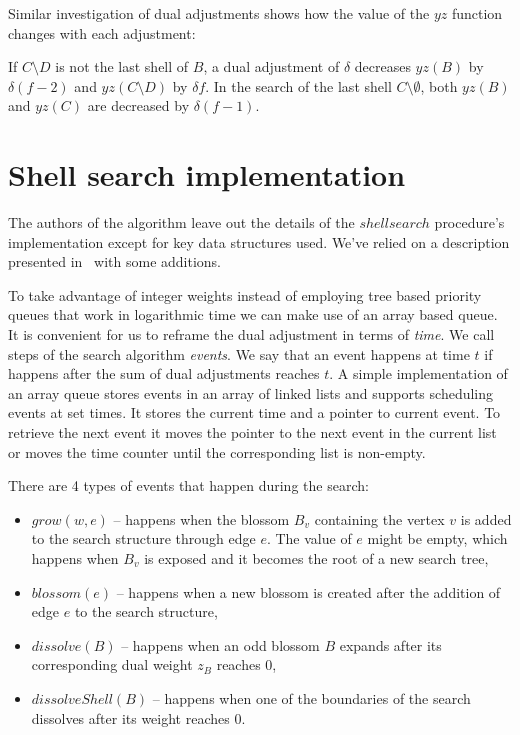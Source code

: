 Similar investigation of dual adjustments shows how the value of the $yz$ function changes with each adjustment:

\begin{lemma}\label{lem:search_duals}
    If $C \setminus D$ is not the last shell of $B$, a dual adjustment of $\delta$ decreases $yz(B)$ by $\delta(f-2)$ and $yz(C \setminus D)$ by $\delta f$. In the search of the last shell $C \setminus \emptyset$, both $yz(B)$ and $yz(C)$ are decreased by $\delta(f-1)$.
\end{lemma}

\section{Shell search implementation}

The authors of the algorithm leave out the details of the $shellsearch$ procedure's implementation except for key data structures used. We've relied on a description presented in~\cite{duan2018scaling} with some additions.

To take advantage of integer weights instead of employing tree based priority queues that work in logarithmic time we can make use of an array based queue. It is convenient for us to reframe the dual adjustment in terms of \textit{time}. We call steps of the search algorithm \textit{events}. We say that an event happens at time $t$ if happens after the sum of dual adjustments reaches $t$. A simple implementation of an array queue stores events in an array of linked lists and supports scheduling events at set times. It stores the current time and a pointer to current event. To retrieve the next event it moves the pointer to the next event in the current list or moves the time counter until the corresponding list is non-empty.

There are 4 types of events that happen during the search:

\begin{itemize}
    \item $grow(w, e)$ – happens when the blossom $B_v$ containing the vertex $v$ is added to the search structure through edge $e$. The value of $e$ might be empty, which happens when $B_v$ is exposed and it becomes the root of a new search tree,
    \item $blossom(e)$ – happens when a new blossom is created after the addition of edge $e$ to the search structure,
    \item $dissolve(B)$ – happens when an odd blossom $B$ expands after its corresponding dual weight $z_B$ reaches $0$,
    \item $dissolveShell(B)$ – happens when one of the boundaries of the search dissolves after its weight reaches $0$. 
\end{itemize}


